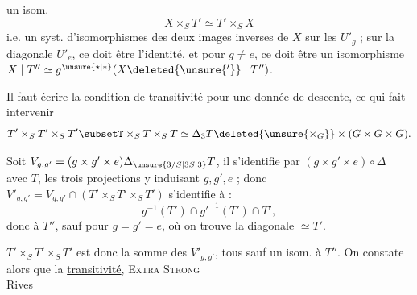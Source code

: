 
un isom.
\[
X\times_S T'\simeq T'\times_S X
\]
i.e. un syst. d'isomorphismes des deux images inverses de $X$ sur les $U'_g$ ; sur la diagonale $U'_e$, ce doit être l'identité, et pour $g\ne e$, ce doit être un isomorphisme $X\mid T''\simeq g^{\unsure{\star|*}}(X\deleted{\unsure{'}}\mid T'')$.

Il faut écrire la condition de transitivité pour une donnée de descente, ce qui fait intervenir
\[
T'\times_S T'\times_S T'\subsetT\times_S T\times_S T\simeq\Delta_3T\deleted{\unsure{\times_G}}\times(G\times G\times G).
\]

Soit $V_{g,g'}=(g\times g'\times e)\Delta_{\unsure{3/S|3S|3}}T$, il s'identifie par $(g\times g'\times e)\circ\Delta$\, avec $T$, les trois projections y induisant $g,g',e$ ; donc $V'_{g,g'}=V_{g,g'}\cap(T'\times_S T'\times_S T')$ s'identifie à :
\[
g^{-1}(T')\cap {g'}^{-1}(T')\cap T',
\]
donc à $T''$, sauf pour $g=g'=e$, où on trouve la diagonale $\simeq T'$.

$T'\times_S T'\times_S T'$ est donc la somme des $V'_{g,g'}$, tous sauf un isom. à $T''$. On constate alors que la \uline{transitivité},
\textsc{Extra Strong}\\
 Rives
